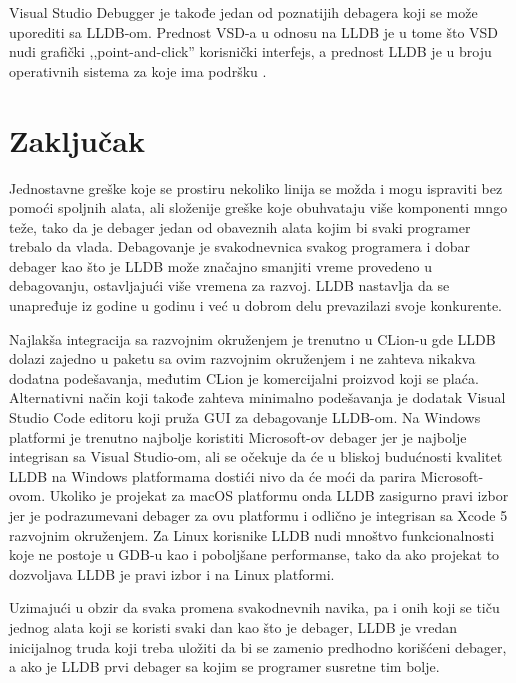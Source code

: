 \documentclass[a4paper]{article}
\begin{document}
Visual Studio Debugger je takođe jedan od poznatijih debagera koji se može uporediti sa LLDB-om. Prednost VSD-a u odnosu na LLDB je u tome što VSD nudi grafički ,,point-and-click'' korisnički interfejs, a prednost LLDB je u broju operativnih sistema za koje ima podršku \cite{vsd}.
\section{Zaključak}
\label{sec:zakljucak}

Jednostavne greške koje se prostiru nekoliko linija se možda i mogu ispraviti bez pomoći spoljnih alata, ali složenije greške koje obuhvataju više komponenti mngo teže, tako da je debager jedan od obaveznih alata kojim bi svaki programer trebalo da vlada.
Debagovanje je svakodnevnica svakog programera i dobar debager kao što je LLDB može značajno smanjiti vreme provedeno u debagovanju, ostavljajući više vremena za razvoj. LLDB nastavlja da se unapređuje iz godine u godinu i već u dobrom delu prevazilazi svoje konkurente.

Najlakša integracija sa razvojnim okruženjem je trenutno u CLion-u gde LLDB dolazi zajedno u paketu sa ovim razvojnim okruženjem i ne zahteva nikakva dodatna podešavanja, međutim CLion je komercijalni proizvod koji se plaća. Alternativni način koji takođe zahteva minimalno podešavanja je dodatak Visual Studio Code editoru koji pruža GUI za debagovanje LLDB-om. Na Windows platformi je trenutno najbolje koristiti Microsoft-ov debager jer je najbolje integrisan sa Visual Studio-om, ali se očekuje da će u bliskoj budućnosti kvalitet LLDB na Windows platformama dostići nivo da će moći da parira Microsoft-ovom. Ukoliko je projekat za macOS platformu onda LLDB zasigurno pravi izbor jer je podrazumevani debager za ovu platformu i odlično je integrisan sa Xcode 5 razvojnim okruženjem. Za Linux korisnike LLDB nudi mnoštvo funkcionalnosti koje ne postoje u GDB-u kao i poboljšane performanse, tako da ako projekat to dozvoljava LLDB je pravi izbor i na Linux platformi.
 
Uzimajući u obzir da svaka promena svakodnevnih navika, pa i onih koji se tiču jednog alata koji se koristi svaki dan kao što je debager, LLDB je vredan inicijalnog truda koji treba uložiti da bi se zamenio predhodno korišćeni debager, a ako je LLDB prvi debager sa kojim se programer susretne tim bolje.
\appendix
 

\end{document}
